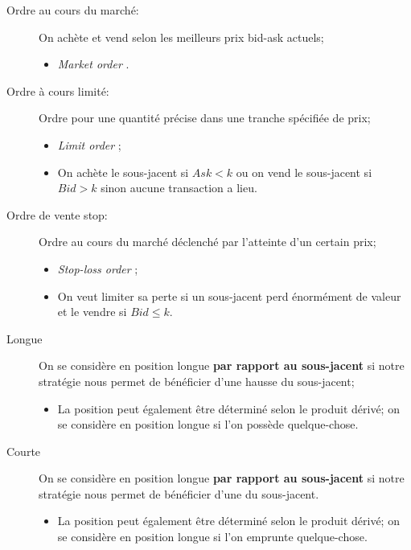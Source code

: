 \documentclass[10pt, french]{article}
\begin{document}
\begin{multicols*}{2}
\begin{distributions}
\begin{description}
	\item[Ordre au cours du marché:]	On achète et vend selon les meilleurs prix bid-ask actuels;
		\begin{itemize}[leftmargin = *]
		\item	\og \textit{Market order} \fg{}.
		\end{itemize}
	\item[Ordre à cours limité:] Ordre pour une quantité précise dans une tranche spécifiée de prix;
		\begin{itemize}[leftmargin = *]
		\item	\og \textit{Limit order} \fg{};
		\item	On achète le sous-jacent si $Ask < k$ ou on vend le sous-jacent si $Bid > k$ sinon aucune transaction a lieu.
		\end{itemize}
	\item[Ordre de vente stop:]	Ordre au cours du marché déclenché par l'atteinte d'un certain prix;
		\begin{itemize}[leftmargin = *]
		\item	\og \textit{Stop-loss order} \fg{};
		\item	On veut limiter sa perte si un sous-jacent perd énormément de valeur et le vendre si $Bid \leq k$.
		\end{itemize}
	\item[Longue] On se considère en position longue \textbf{par rapport au sous-jacent} si notre stratégie nous permet de bénéficier d'une \textcolor{ao(english)}{hausse} du sous-jacent;
		\begin{itemize}[leftmargin = *]
		\item	La position peut également être déterminé selon le produit dérivé; on se considère en position longue si l'on possède quelque-chose.
		\end{itemize}
	\item[Courte] On se considère en position longue \textbf{par rapport au sous-jacent} si notre stratégie nous permet de bénéficier d'une  du sous-jacent.
		\begin{itemize}[leftmargin = *]
		\item	La position peut également être déterminé selon le produit dérivé; on se considère en position longue si l'on emprunte quelque-chose.
		\end{itemize}
\end{description}
\end{distributions}


\end{multicols*}
\end{document}
